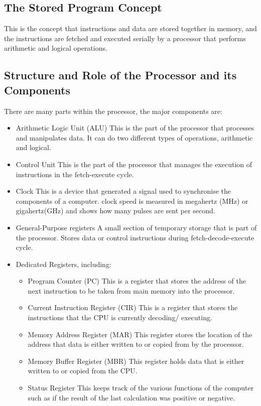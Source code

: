 \subsection{The Stored Program Concept} \noindent
  This is the concept that instructions and data are stored together in memory, and the instructions are fetched and executed serially by a processor that performs arithmetic and logical operations.
\subsection{Structure and Role of the Processor and its Components} \noindent
  There are many parts within the processor, the major components are:
  \begin{itemize}
    \setlength{\itemsep}{0em}
    \item Arithmetic Logic Unit (ALU)
      \subitem This is the part of the processor that processes and manipulates data. It can do two different types of operations, arithmetic and logical.
    \item Control Unit
      \subitem This is the part of the processor that manages the execution of instructions in the fetch-execute cycle.
    \item Clock
      \subitem This is a device that generated a signal used to synchronise the components of a computer. clock speed is measured in megahertz (MHz) or gigahertz(GHz) and shows how many pulses are sent per second.
    \item General-Purpose registers
      \subitem A small section of temporary storage that is part of the processor. Stores data or control instructions during fetch-decode-execute cycle.
    \item Dedicated Registers, including:
    \begin{itemize}
      \setlength{\itemsep}{0em}
      \item Program Counter (PC)
        \subitem This is a register that stores the address of the next instruction to be taken from main memory into the processor.
      \item Current Instruction Register (CIR)
        \subitem This is a register that stores the instructions that the CPU is currently decoding/ executing.
      \item Memory Address Register (MAR)
        \subitem This register stores the location of the address that data is either written to or copied from by the processor.
      \item Memory Buffer Register (MBR)
        \subitem This register holds data that is either written to or copied from the CPU.
      \item Status Register
        \subitem This keeps track of the various functions of the computer such as if the result of the last calculation was positive or negative.
    \end{itemize}
  \end{itemize}

